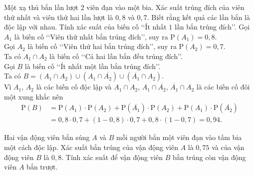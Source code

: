 \begin{bt}%

    Một xạ thủ bắn lần lượt $2$ viên đạn vào một bia. Xác suất trúng đích của viên thứ nhất và viên thứ hai lần lượt là $0{,}8$ và $0{,}7$. Biết rằng kết quả các lần bắn là độc lập với nhau. Tính xác suất của biến cố \lq\lq Ít nhất $1$ lần bắn trúng đích\rq\rq.
    \loigiai
    {
        Gọi $A_1$ là biến cố \lq\lq Viên thứ nhất bắn trúng đích\rq\rq, suy ra $\mathrm{P}\left(A_1\right)=0{,}8$.\\
        Gọi $A_2$ là biến cố \lq\lq Viên thứ hai bắn trúng đích\rq\rq, suy ra $\mathrm{P}\left(A_2\right)=0{,}7$.\\
        Ta có $A_1\cap A_2$ là biến cố \lq\lq Cả hai lần bắn đều trúng đích\rq\rq.\\
        Gọi $B$ là biến cố \lq\lq Ít nhất một lần bắn trúng đích\rq\rq.\\
        Ta có $B=\left(A_1\cap A_2\right)\cup\left(A_1\cap\overline{A_2}\right)\cup\left(\overline{A_1}\cap A_2\right)$.\\
        Vì $A_1$, $A_2$ là các biến cố độc lập và $A_1\cap A_2$, $ A_1\cap\overline{A_2}$, $\overline{A_1}\cap A_2$ là các biến cố đôi một xung khắc nên
        $$\begin{aligned}
            \mathrm{P}(B)
            &=\mathrm{P}\left(A_1\right)\cdot\mathrm{P}\left(A_2\right)+\mathrm{P}\left(\overline{A_1}\right)\cdot\mathrm{P}\left(A_2\right)+\mathrm{P}\left(A_1\right)\cdot\mathrm{P}\left(\overline{A_2}\right) \\
            &=0{,}8\cdot0{,}7+\left(1-0{,}8\right)\cdot0{,}7+0{,}8\cdot\left(1-0{,}7\right)=0{,}94.
        \end{aligned}$$
    }
\end{bt}

\begin{bt}%

    Hai vận động viên bắn súng $A$ và $B$ mỗi người bắn một viên đạn vào tấm bia một cách độc lập. Xác suất bắn trúng của vận động viên $A$ là $0{,}75$ và của vận động viên $B$ là $0{,}8$. Tính xác suất để vận động viên $B$ bắn trúng còn vận động viên $A$ bắn trượt.
\end{bt}

